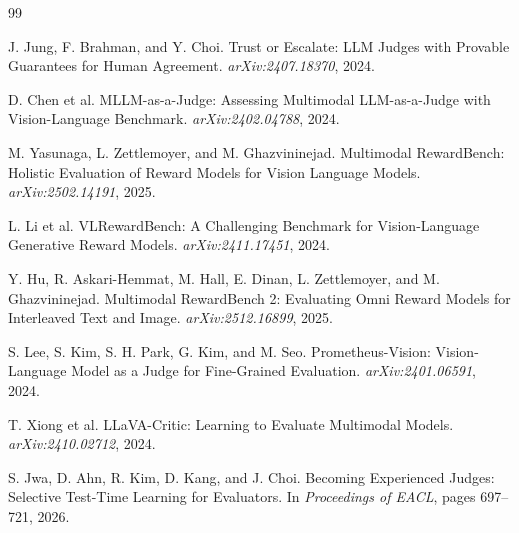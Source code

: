 \documentclass[10pt]{article}
\begin{document}
\begin{thebibliography}{99}

J. Jung, F. Brahman, and Y. Choi.
\newblock Trust or Escalate: LLM Judges with Provable Guarantees for Human Agreement.
\newblock \emph{arXiv:2407.18370}, 2024.

D. Chen et al.
\newblock MLLM-as-a-Judge: Assessing Multimodal LLM-as-a-Judge with Vision-Language Benchmark.
\newblock \emph{arXiv:2402.04788}, 2024.

M. Yasunaga, L. Zettlemoyer, and M. Ghazvininejad.
\newblock Multimodal RewardBench: Holistic Evaluation of Reward Models for Vision Language Models.
\newblock \emph{arXiv:2502.14191}, 2025.

L. Li et al.
\newblock VLRewardBench: A Challenging Benchmark for Vision-Language Generative Reward Models.
\newblock \emph{arXiv:2411.17451}, 2024.

Y. Hu, R. Askari-Hemmat, M. Hall, E. Dinan, L. Zettlemoyer, and M. Ghazvininejad.
\newblock Multimodal RewardBench 2: Evaluating Omni Reward Models for Interleaved Text and Image.
\newblock \emph{arXiv:2512.16899}, 2025.

S. Lee, S. Kim, S. H. Park, G. Kim, and M. Seo.
\newblock Prometheus-Vision: Vision-Language Model as a Judge for Fine-Grained Evaluation.
\newblock \emph{arXiv:2401.06591}, 2024.

T. Xiong et al.
\newblock LLaVA-Critic: Learning to Evaluate Multimodal Models.
\newblock \emph{arXiv:2410.02712}, 2024.

S. Jwa, D. Ahn, R. Kim, D. Kang, and J. Choi.
\newblock Becoming Experienced Judges: Selective Test-Time Learning for Evaluators.
\newblock In \emph{Proceedings of EACL}, pages 697--721, 2026.

\end{thebibliography}
\end{document}
